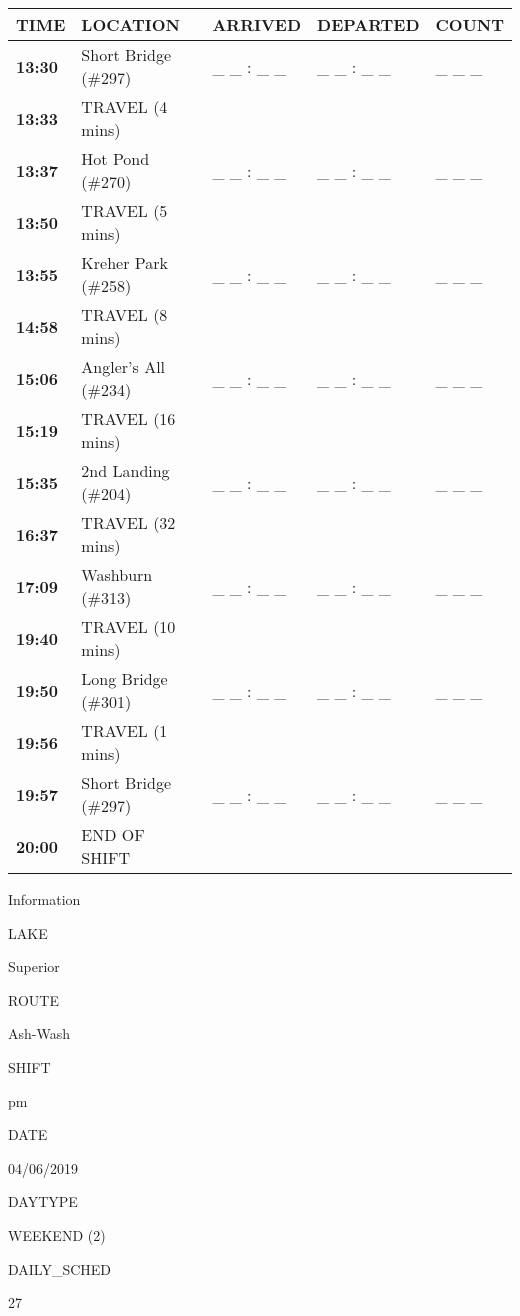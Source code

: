 \documentclass[]{article}
\begin{document}
\begin{tabular}{>{\bfseries}lllll}
\toprule
\textbf{TIME} & \textbf{LOCATION} & \textbf{ARRIVED} & \textbf{DEPARTED} & \textbf{COUNT}\\
\midrule
13:30 & Short Bridge (\#297) & \_ \_ : \_ \_ & \_ \_ : \_ \_ & \_ \_ \_\\
13:33 & TRAVEL (4 mins) &  &  & \\
13:37 & Hot Pond (\#270) & \_ \_ : \_ \_ & \_ \_ : \_ \_ & \_ \_ \_\\
13:50 & TRAVEL (5 mins) &  &  & \\
13:55 & Kreher Park (\#258) & \_ \_ : \_ \_ & \_ \_ : \_ \_ & \_ \_ \_\\
14:58 & TRAVEL (8 mins) &  &  & \\
15:06 & Angler's All (\#234) & \_ \_ : \_ \_ & \_ \_ : \_ \_ & \_ \_ \_\\
15:19 & TRAVEL (16 mins) &  &  & \\
15:35 & 2nd Landing (\#204) & \_ \_ : \_ \_ & \_ \_ : \_ \_ & \_ \_ \_\\
16:37 & TRAVEL (32 mins) &  &  & \\
17:09 & Washburn (\#313) & \_ \_ : \_ \_ & \_ \_ : \_ \_ & \_ \_ \_\\
19:40 & TRAVEL (10 mins) &  &  & \\
19:50 & Long Bridge (\#301) & \_ \_ : \_ \_ & \_ \_ : \_ \_ & \_ \_ \_\\
19:56 & TRAVEL (1 mins) &  &  & \\
19:57 & Short Bridge (\#297) & \_ \_ : \_ \_ & \_ \_ : \_ \_ & \_ \_ \_\\
20:00 & END OF SHIFT &  &  & \\
\bottomrule
\end{tabular}\newpage

Information

LAKE

Superior

ROUTE

Ash-Wash

SHIFT

pm

DATE

04/06/2019

DAYTYPE

WEEKEND (2)

DAILY\_SCHED

27

\vspace{24pt}
\end{document}
